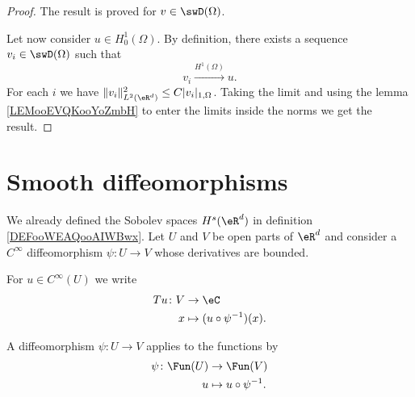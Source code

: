 \begin{proof}
        The result is proved for \( v\in\swD(\Omega)\).

        Let now consider \( u\in H_0^1(\Omega)\). By definition, there exists a sequence \( v_i\in\swD(\Omega)\) such that
        \begin{equation}
            v_i\stackrel{H^1(\Omega)}{\longrightarrow}u.
        \end{equation}
        For each \( i\) we have \( \| v_i \|^2_{L^2(\eR^d)}\leq C| v_i |_{1,\Omega}\). Taking the limit and using the lemma \ref{LEMooEVQKooYoZmbH} to enter the limits inside the norms we get the result.
\end{proof}

\section{Smooth diffeomorphisms}

We already defined the Sobolev spaces \( H^s(\eR^d)\) in definition \ref{DEFooWEAQooAIWBwx}. Let \( U\) and \( V\) be open parts of \( \eR^d\) and consider a \(  C^{\infty}\) diffeomorphism \( \psi\colon U\to V\) whose derivatives are bounded.

For \( u\in  C^{\infty}(U)\) we write
\begin{equation}        \label{EQooHSVBooIZRxzh}
    \begin{aligned}
        Tu\colon V&\to \eC \\
        x&\mapsto (u\circ \psi^{-1})(x). 
    \end{aligned}
\end{equation}

A diffeomorphism \( \psi\colon U\to V\) applies to the functions by
\begin{equation}        \label{EQooMZSEooATfSTR}
    \begin{aligned}
        \psi\colon \Fun(U)&\to \Fun(V) \\
        u&\mapsto u\circ\psi^{-1}. 
    \end{aligned}
\end{equation}

